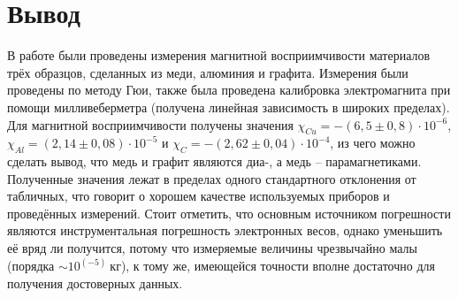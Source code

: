 \documentclass[a4paper,12pt]{article}
\begin{document}
\section*{Вывод}

В работе были проведены измерения магнитной восприимчивости материалов трёх образцов, сделанных из меди, алюминия и графита. Измерения были проведены по методу Гюи, также была проведена калибровка электромагнита при помощи милливеберметра (получена линейная зависимость в широких пределах). Для магнитной восприимчивости получены значения $\chi_{Cu}=-\left(6,5\pm0,8\right)\cdot10^{-6}$, $\chi_{Al}=\left(2,14\pm0,08\right)\cdot10^{-5}$ и $\chi_C=-\left(2,62\pm0,04\right)\cdot10^{-4}$, из чего можно сделать вывод, что медь и графит являются диа-, а медь -- парамагнетиками. Полученные значения лежат в пределах одного стандартного отклонения от табличных, что говорит о хорошем качестве используемых приборов и проведённых измерений. Стоит отметить, что основным источником погрешности являются инструментальная погрешность электронных весов, однако уменьшить её вряд ли получится, потому что измеряемые величины чрезвычайно малы (порядка $\sim10^{(-5)}~\text{кг}$), к тому же, имеющейся точности вполне достаточно для получения достоверных данных.
\end{document}
